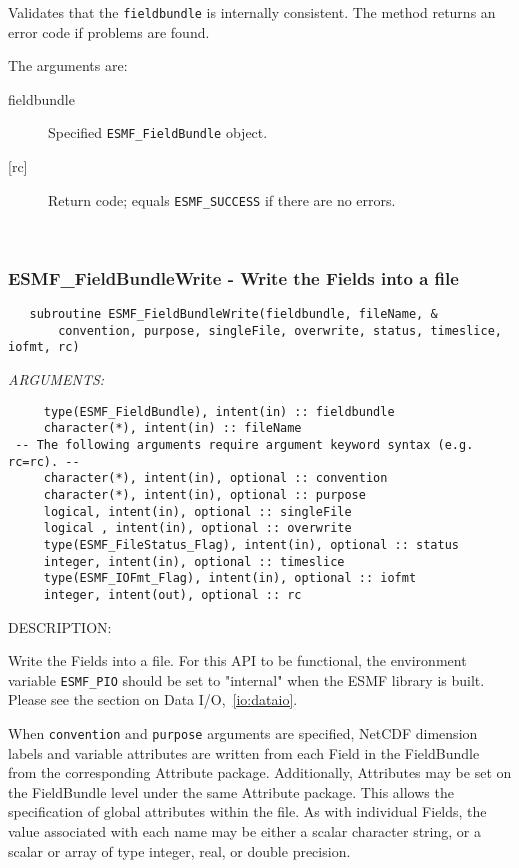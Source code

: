    Validates that the {\tt fieldbundle} is internally consistent.
   The method returns an error code if problems are found.
  
   The arguments are:
   \begin{description}
   \item[fieldbundle]
   Specified {\tt ESMF\_FieldBundle} object.
   \item[{[rc]}]
   Return code; equals {\tt ESMF\_SUCCESS} if there are no errors.
   \end{description}
   
 
\mbox{}\hrulefill\ 
 
\subsubsection [ESMF\_FieldBundleWrite] {ESMF\_FieldBundleWrite - Write the Fields into a file}


   \label{api:FieldBundleWrite}
\begin{verbatim}   subroutine ESMF_FieldBundleWrite(fieldbundle, fileName, &
       convention, purpose, singleFile, overwrite, status, timeslice, iofmt, rc)\end{verbatim}{\em ARGUMENTS:}
\begin{verbatim}     type(ESMF_FieldBundle), intent(in) :: fieldbundle
     character(*), intent(in) :: fileName
 -- The following arguments require argument keyword syntax (e.g. rc=rc). --
     character(*), intent(in), optional :: convention
     character(*), intent(in), optional :: purpose
     logical, intent(in), optional :: singleFile
     logical , intent(in), optional :: overwrite
     type(ESMF_FileStatus_Flag), intent(in), optional :: status
     integer, intent(in), optional :: timeslice
     type(ESMF_IOFmt_Flag), intent(in), optional :: iofmt
     integer, intent(out), optional :: rc\end{verbatim}
{\sf DESCRIPTION:\\ }


   Write the Fields into a file. For this API to be functional,
   the environment variable {\tt ESMF\_PIO} should be set to "internal"
   when the ESMF library is built. Please see the section on
   Data I/O,~\ref{io:dataio}.
  
   When {\tt convention} and {\tt purpose} arguments are specified, NetCDF dimension
   labels and variable attributes are written from each Field in the FieldBundle
   from the corresponding Attribute package. Additionally, Attributes may be
   set on the FieldBundle level under the same Attribute package. This allows
   the specification of global attributes within the file.
   As with individual Fields, the value associated with each name may be either
   a scalar character string, or a scalar or array of type integer, real, or
   double precision.
  
